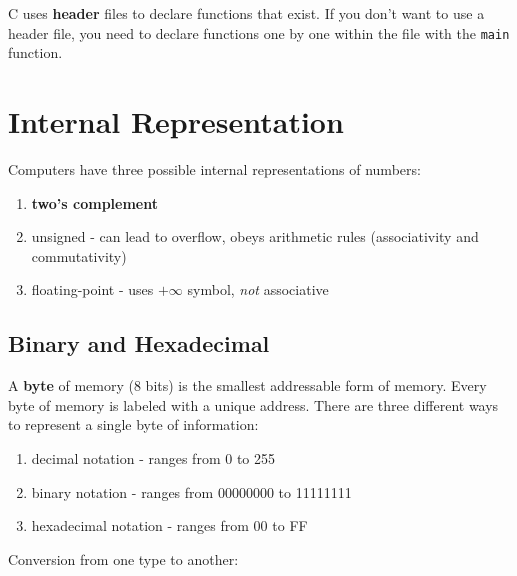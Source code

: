 \documentclass{article}
\theoremstyle{definition} %
\begin{document}
\begin{flushleft}
C uses \textbf{header} files to declare functions that exist. If you don't want to use a header file, you need to declare functions one by one within the file with the \texttt{main} function.


\section{Internal Representation}

Computers have three possible internal representations of numbers:

\begin{enumerate}
    \item \textbf{two's complement}
    \item unsigned - can lead to overflow, obeys arithmetic rules (associativity and commutativity)
    \item floating-point - uses $+\infty$ symbol, \textit{not} associative
\end{enumerate}

\subsection{Binary and Hexadecimal}

A \textbf{byte} of memory (8 bits) is the smallest addressable form of memory. Every byte of memory is labeled with a unique address. There are three different ways to represent a single byte of information:

\begin{enumerate}
    \item decimal notation - ranges from 0 to 255
    \item binary notation - ranges from 00000000 to 11111111
    \item hexadecimal notation - ranges from 00 to FF
\end{enumerate}

Conversion from one type to another:

\begin{center}


\end{center}
\end{flushleft}
\end{document}
